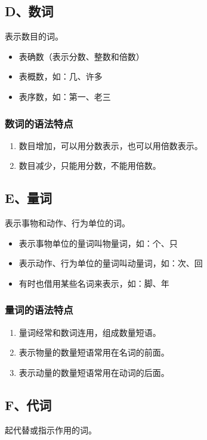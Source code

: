 \subsection{D、数词}
表示数目的词。

\begin{itemize}
    \item 表确数（表示分数、整数和倍数）
    \item 表概数，如：几、许多
    \item 表序数，如：第一、老三
\end{itemize}

\subsubsection*{数词的语法特点}
\begin{enumerate}
    \item 数目增加，可以用分数表示，也可以用倍数表示。
    \item 数目减少，只能用分数，不能用倍数。
\end{enumerate}

\subsection{E、量词}
表示事物和动作、行为单位的词。

\begin{itemize}
    \item 表示事物单位的量词叫物量词，如：个、只
    \item 表示动作、行为单位的量词叫动量词，如：次、回
    \item 有时也借用某些名词来表示，如：脚、年
\end{itemize}

\subsubsection*{量词的语法特点}
\begin{enumerate}
    \item 量词经常和数词连用，组成数量短语。
    \item 表示物量的数量短语常用在名词的前面。
    \item 表示动量的数量短语常用在动词的后面。
\end{enumerate}

\subsection{F、代词}
起代替或指示作用的词。

